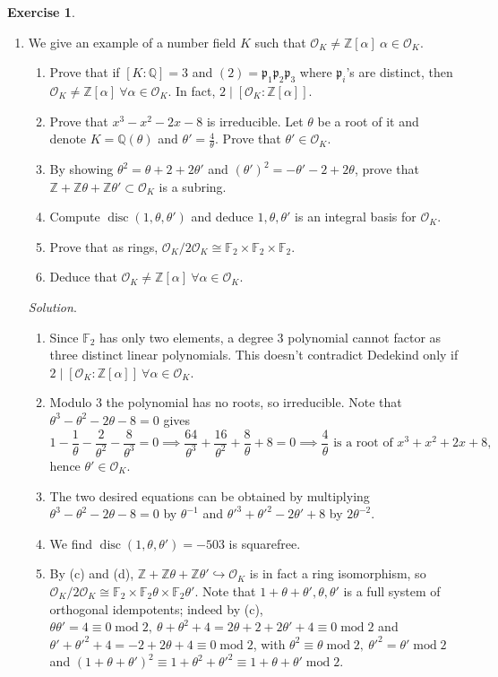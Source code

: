 \documentclass{article}
\newcommand{\Z}{\mathbb{Z}}
\newcommand{\Q}{\mathbb{Q}}
\newcommand{\F}{\mathbb{F}}
\newcommand{\Mod}{\operatorname{mod}}
\newcommand{\disc}{\operatorname{disc}}
\newcommand{\ri}{\mathcal{O}}
\newcommand{\ip}{\mathfrak{p}}
\theoremstyle{definition}
\newtheorem{exe}[defn]{Exercise}
\begin{document}
\begin{exe}
\begin{enumerate}
\item We give an example of a number field $K$ such that $\ri_K\neq\Z[\alpha]\ \alpha\in\ri_K$.
\begin{enumerate}
\item Prove that if $[K:\Q]=3$ and $(2)=\ip_1\ip_2\ip_3$ where $\ip_i$'s are distinct, then $\ri_K\neq\Z[\alpha] \ \forall\alpha\in\ri_K$. In fact, $2\mid[\ri_K:\Z[\alpha]]$.
\item Prove that $x^3-x^2-2x-8$ is irreducible. Let $\theta$ be a root of it and denote $K=\Q(\theta)$ and $\theta'=\frac{4}{\theta}$. Prove that $\theta'\in\ri_K$.
\item By showing $\theta^2=\theta+2+2\theta'$ and $(\theta')^2=-\theta'-2+2\theta$, prove that $\Z+\Z\theta+\Z\theta'\subset\ri_K$ is a subring.
\item Compute $\disc(1,\theta,\theta')$ and deduce $1,\theta,\theta'$ is an integral basis for $\ri_K$.
\item Prove that as rings, $\ri_K/2\ri_K\cong\F_2\times\F_2\times\F_2$.
\item Deduce that $\ri_K\neq\Z[\alpha] \ \forall\alpha\in\ri_K$.
\end{enumerate}
\textit{Solution}. \begin{enumerate}
\item Since $\F_2$ has only two elements, a degree 3 polynomial cannot factor as three distinct linear polynomials. This doesn't contradict Dedekind only if $2\mid[\ri_K:\Z[\alpha]] \ \forall\alpha\in\ri_K$.
\item Modulo 3 the polynomial has no roots, so irreducible. Note that $\theta^3-\theta^2-2\theta-8=0$ gives
\[
1-\frac{1}{\theta}-\frac{2}{\theta^2}-\frac{8}{\theta^3}=0\implies \frac{64}{\theta^3}+\frac{16}{\theta^2}+\frac{8}{\theta}+8=0\implies \frac{4}{\theta}\text{ is a root of }x^3+x^2+2x+8,
\]
hence $\theta'\in\ri_K$.
\item The two desired equations can be obtained by multiplying $\theta^3-\theta^2-2\theta-8=0$ by $\theta^{-1}$ and $\theta'^3+\theta'^2-2\theta'+8$ by $2\theta^{-2}$.
\item We find $\disc(1,\theta,\theta')=-503$ is squarefree.
\item By (c) and (d), $\Z+\Z\theta+\Z\theta'\hookrightarrow\ri_K$ is in fact a ring isomorphism, so $\ri_K/2\ri_K\cong\F_2\times\F_2\theta\times\F_2\theta'$. Note that $1+\theta+\theta',\theta,\theta'$ is a full system of orthogonal idempotents; indeed by (c), $\theta\theta'=4\equiv 0\Mod 2,\ \theta+\theta^2+4=2\theta+2+2\theta'+4\equiv 0\Mod 2$ and $\theta'+\theta'^2+4=-2+2\theta+4\equiv 0\Mod 2$, with $\theta^2\equiv\theta\Mod 2,\ \theta'^2=\theta'\Mod 2$ and $(1+\theta+\theta')^2\equiv 1+\theta^2+\theta'^2\equiv 1+\theta+\theta'\Mod 2$.

\end{enumerate}
\end{enumerate}
\end{exe}
\end{document}
